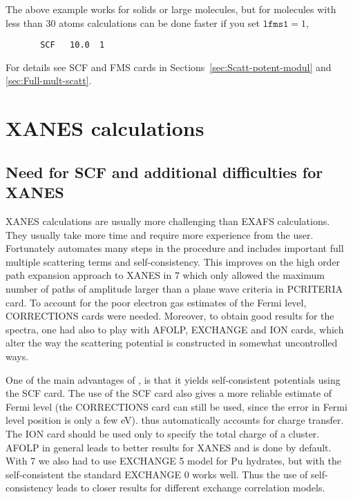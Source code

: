 \documentclass[11pt,oneside]{report} %
\begin{document}
The above example works for
solids or large molecules, but for molecules with less than 30 atoms
calculations can be done faster if you set $\mathtt{lfms1}=1$,
\begin{verbatim}
       SCF   10.0  1
\end{verbatim}

For details see SCF and FMS cards in
Sections~\ref{sec:Scatt-potent-modul} and \ref{sec:Full-mult-scatt}.


\section{XANES calculations}
\label{sec:XANES-calculations}

\subsection{Need for SCF and additional difficulties for XANES}
\label{sec:Addit-diff}

XANES calculations are usually more challenging than EXAFS calculations.
They usually take more time and require more experience from the user.
Fortunately {\feffcur} automates many steps in the procedure and includes
important full multiple scattering terms and self-consistency. This improves
on the high order path expansion approach to XANES in {\feff}7 which
only allowed the maximum number of paths of amplitude larger than a plane wave
criteria in PCRITERIA  card. To account for the poor electron gas estimates of
the Fermi level, CORRECTIONS cards were needed.  Moreover, to obtain
good results for the spectra, one had also to play with AFOLP, EXCHANGE
and ION cards, which alter the way the scattering potential is constructed
in somewhat uncontrolled ways.

One of the main advantages of {\feffcur}, is that it yields self-consistent
potentials using the SCF card. The use of the SCF card also gives a
more reliable estimate of Fermi level (the CORRECTIONS card
can still be used, since the error in Fermi level position is only a few eV).
{\feffcur} thus automatically accounts for charge transfer.
The ION card should be used only
to specify the total charge of a cluster. AFOLP in general
leads to better results for XANES and is done by default. With
{\feff}7 we also had to use EXCHANGE 5 model for Pu hydrates,
but with the self-consistent {\feffcur} the standard EXCHANGE 0
works well.  Thus the use of self-consistency leads to
closer results for different exchange correlation models.
\end{document}
